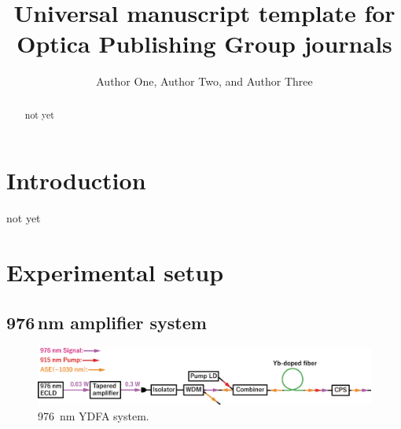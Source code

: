 \documentclass{osa-article}
\begin{document}
\title{Universal manuscript template for Optica Publishing Group journals}

\author{Author One, Author Two, and Author Three}

\address{Reserch Institute for Interdisciplinary Science, Okayama University, Okayama, Japan}




\begin{abstract}
not yet
\end{abstract}

\section{Introduction}
not yet

\section{Experimental setup}
\subsection{976\,nm amplifier system}

\begin{figure}[h!]
  \centering\includegraphics[width=\linewidth]{./Figure/976nmYDFASystem.eps}
  \caption{\SI{976}{nm} YDFA system.}
  \label{fig:976YDFASystem}
\end{figure}
\end{document}
